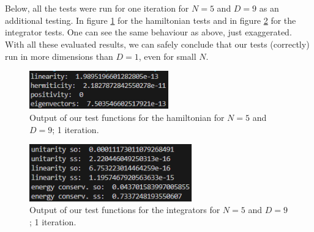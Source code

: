 \documentclass[11pt, letterpaper, onecolumn]{article}
\begin{document}
	\\
	\\
	Below, all the tests were run for one iteration for $N=5$ and $D=9$ as an additional testing. In figure \ref{fig:test-hamiltonian-9D} for the hamiltonian tests and in figure \ref{fig:test-integrators-9D} for the integrator tests. One can see the same behaviour as above, just exaggerated. \\
	With all these evaluated results, we can safely conclude that our tests (correctly) run in more dimensions than $D=1$, even for small $N$.
	\begin{figure} [h] 
	\begin{center}
	\includegraphics[width=6cm]{"test_hamiltonian-9D2.png"}
	\caption{Output of our test functions for the hamiltonian for $N=5$ and $D=9$; 1 iteration.} \label{fig:test-hamiltonian-9D}
	\end{center}
	\end{figure}
	\begin{figure} [h] 
	\begin{center}
	\includegraphics[width=7cm]{"test_integrators-9D2.png"}
	\caption{Output of our test functions for the integrators for $N=5$ and $D=9$; 1 iteration.} \label{fig:test-integrators-9D}
	\end{center}
	\end{figure}
	
	
	
	
	
	
	
\end{document}
